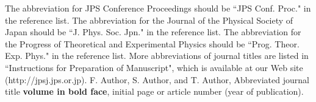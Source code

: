 \documentclass{jps-cp}
\begin{document}
\begin{thebibliography}{9}
 The abbreviation for JPS Conference Proceedings should be ``JPS Conf. Proc." in the reference list.
 The abbreviation for the Journal of the Physical Society of Japan should be ``J. Phys. Soc. Jpn." in the reference list.
 The abbreviation for the Progress of Theoretical and Experimental Physics should be ``Prog. Theor. Exp. Phys." in the reference list.
 More abbreviations of journal titles are listed in ``Instructions for Preparation of Manuscript", which is available at our Web site (http://jpsj.jps.or.jp).
 F. Author, S. Author, and T. Author, Abbreviated journal title \textbf{volume in bold face}, initial page or article number (year of publication).
\end{thebibliography}
\end{document}
